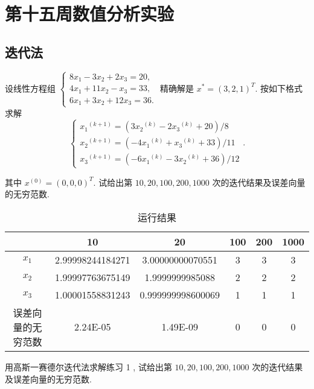\section{第十五周数值分析实验}
\subsection{迭代法}
\begin{ex}
设线性方程组 $\left\{\begin{array}{l}8 x_1-3 x_2+2 x_3=20, \\ 4 x_1+11 x_2-x_3=33, \\ 6 x_1+3 x_2+12 x_3=36 .\end{array}\right.$ 精确解是 $x^*=(3,2,1)^T$. 按如下格式求解
$$
\left\{\begin{array}{l}
	x_1{ }^{(k+1)}=\left(3 x_2{ }^{(k)}-2 x_3{ }^{(k)}+20\right) / 8 \\
	x_2{ }^{(k+1)}=\left(-4 x_1{ }^{(k)}+x_3{ }^{(k)}+33\right) / 11 \\
	x_3{ }^{(k+1)}=\left(-6 x_1{ }^{(k)}-3 x_2{ }^{(k)}+36\right) / 12
\end{array}\right. .
$$

其中 $x^{(0)}=(0,0,0)^T$. 试给出第 $10,20,100,200,1000$ 次的迭代结果及误差向量的无穷范数.
\end{ex}

\qa 
\begin{table}[H]
	\centering
	\caption{运行结果}
	\begin{tabular}{c|ccccc}
		& 10    & 20    & 100   & 200   & 1000 \\
		\hline
		$x_1$    & 2.99998244184271 &3.00000000070551 & 3     & 3     & 3 \\
		$x_2$    & 1.99997763675149 & 1.9999999985088   & 2     & 2     & 2 \\
		$x_3$    & 1.00001558831243 & 0.999999998600069 & 1     & 1     & 1 \\
		误差向量的无穷范数 & 2.24E-05 & 1.49E-09 & 0     & 0     & 0 \\
	\end{tabular}%
	\label{tab:addlabelw15-1}%
\end{table}%


\begin{ex}
	用高斯一赛德尔迭代法求解练习 1 , 试给出第 $10,20,100,200,1000$ 次的迭代结果及误差向量的无穷范数.
\end{ex}
